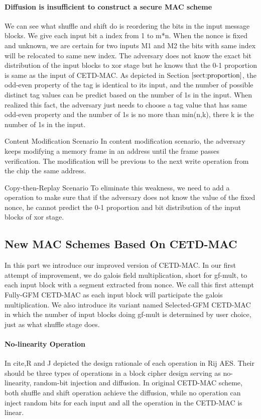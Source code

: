 \paragraph{Diffusion is insufficient to construct a secure MAC scheme}
\label{par:diffusion}
We can see what shuffle and shift do is reordering the bits in the input message
blocks. We give each input bit a index from 1 to m*n. When the nonce is fixed
and unknown, we are certain for two inputs M1 and M2 the bits with same index
will be relocated to same new index. The adversary does not know the exact bit
distribution of the input blocks to xor stage but he knows that the 0-1
proportion is same as the input of CETD-MAC. As depicted in Section $\ref{sect:proportion}$, the odd-even property of the tag is identical to its input, and the number of possible distinct tag values can be predict based on the number of 1s in the input. When realized this fact, the adversary just needs to choose a tag value that has same odd-even property and the number of 1s is no more than min(n,k), there k is the number of 1s in the input.

Content Modification Scenario
In content modification scenario, the adversary keeps modifying a memory frame in an address until the frame passes verification. The modification will be previous to the next write operation from the chip the same address. 

Copy-then-Replay Scenario
To eliminate this weakness, we need to add a operation to make sure that if the adversary does not know the value of the fixed nonce, he cannot predict the 0-1 proportion and bit distribution of the input blocks of xor stage. 

\subsection{New MAC Schemes Based On CETD-MAC}
In this part we introduce our improved version of CETD-MAC. In our first attempt
of improvement, we do galois field multiplication, short for gf-mult, to each input block with a
segment extracted from nonce. We call this first attempt Fully-GFM CETD-MAC as
each input block will participate the galois multiplication. We also introduce
its variant named Selected-GFM CETD-MAC in which the number of input blocks
doing gf-mult is determined by user choice, just as what shuffle stage does. 

\paragraph{No-linearity Operation}
In cite{},R and J depicted the design rationale of each operation in Rij AES. Their should be three types of operations in a block cipher design serving as no-linearity, random-bit injection and diffusion.  
In original CETD-MAC scheme, both shuffle and shift operation achieve the diffusion, while no operation can inject random bits for each input and all the operation in the CETD-MAC is linear.  

